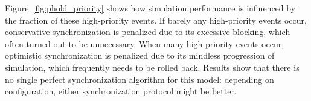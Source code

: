 Figure~\ref{fig:phold_priority} shows how simulation performance is influenced by the fraction of these high-priority events.
If barely any high-priority events occur, conservative synchronization is penalized due to its excessive blocking, which often turned out to be unnecessary.
When many high-priority events occur, optimistic synchronization is penalized due to its mindless progression of simulation, which frequently needs to be rolled back.
Results show that there is no single perfect synchronization algorithm for this model: depending on configuration, either synchronization protocol might be better.
